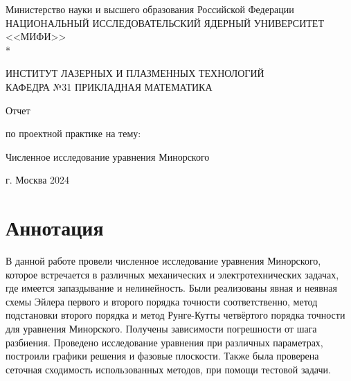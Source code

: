 \documentclass[a4paper,12pt]{article}
\begin{document}
		\renewcommand{\contentsname}{\Large Содержание}
		\renewcommand{\bibname}{\normalfont\Large\bfseries Список литературы}
		
		\begin{titlepage}
			\begin{center}
				Министерство науки и высшего образования Российской Федерации \\
				НАЦИОНАЛЬНЫЙ ИССЛЕДОВАТЕЛЬСКИЙ ЯДЕРНЫЙ УНИВЕРСИТЕТ <<МИФИ>> \\*
				\hrulefill\\
			\end{center}
		
		\begin{center}
			ИНСТИТУТ ЛАЗЕРНЫХ И ПЛАЗМЕННЫХ ТЕХНОЛОГИЙ\\
			КАФЕДРА №31 ПРИКЛАДНАЯ МАТЕМАТИКА
		\end{center}
		\vspace{1cm}
		
		\vspace{2em}
		
		\begin{center}
			\large{Отчет}
			
			по проектной практике на тему:
		\end{center}
		
		\begin{center}
			\large Численное исследование уравнения Минорского
		\end{center}
	
	

\vspace{32em}
		
		\begin{center}
			г. Москва 2024
		\end{center}
	\end{titlepage}

	\newpage
	\section*{Аннотация}
	
	В данной работе провели численное исследование уравнения Минорского,
которое встречается в различных механических и электротехнических задачах, 
где имеется запаздывание и нелинейность. Были реализованы явная и неявная 
схемы Эйлера первого и второго порядка точности соответственно, метод 
подстановки второго порядка и метод Рунге-Кутты четвёртого порядка точности для 
уравнения Минорского. Получены зависимости погрешности от шага разбиения. 
Проведено исследование уравнения при различных параметрах, построили графики 
решения и фазовые плоскости.
Также была проверена сеточная сходимость использованных методов, 
при помощи тестовой задачи.
\end{document}
